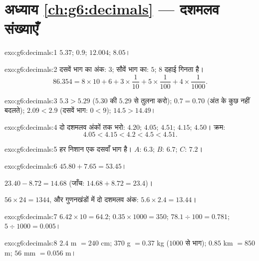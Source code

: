 \section*{अध्याय \ref{ch:g6:decimals} --- दशमलव संख्याएँ}

\begin{solution}{exo:g6:decimals:1}
$5.37$; \quad $0.9$; \quad $12.004$; \quad $8.05$।
\end{solution}

\begin{solution}{exo:g6:decimals:2}
दसवें भाग का अंक: $3$; सौवें भाग का: $5$; $8$ दहाई गिनता है।
\[
86.354 = 8 \times 10 + 6 + 3 \times \frac{1}{10} + 5 \times
\frac{1}{100} + 4 \times \frac{1}{1000}.
\]
\end{solution}

\begin{solution}{exo:g6:decimals:3}
$5.3 > 5.29$ ($5.30$ की $5.29$ से तुलना करो); \quad
$0.7 = 0.70$ (अंत के  कुछ नहीं बदलते); \quad
$2.09 < 2.9$ (दसवें भाग: $0 < 9$); \quad
$14.5 > 14.49$।
\end{solution}

\begin{solution}{exo:g6:decimals:4}
दो दशमलव अंकों तक भरो: $4.20$; $4.05$; $4.51$; $4.15$; $4.50$। क्रम:
\[
4.05 < 4.15 < 4.2 < 4.5 < 4.51 .
\]
\end{solution}

\begin{solution}{exo:g6:decimals:5}
हर निशान एक दसवाँ भाग है। $A$: $6.3$; \quad $B$: $6.7$; \quad
$C$: $7.2$।
\end{solution}

\begin{solution}{exo:g6:decimals:6}
$45.80 + 7.65 = 53.45$।

$23.40 - 8.72 = 14.68$ (जाँच: $14.68 + 8.72 = 23.4$)।

$56 \times 24 = 1344$, और गुणनखंडों में दो दशमलव अंक:
$5.6 \times 2.4 = 13.44$।
\end{solution}

\begin{solution}{exo:g6:decimals:7}
$6.42 \times 10 = 64.2$; \quad
$0.35 \times 1000 = 350$; \quad
$78.1 \div 100 = 0.781$; \quad
$5 \div 1000 = 0.005$।
\end{solution}

\begin{solution}{exo:g6:decimals:8}
$2.4$ m $= 240$ cm; \quad $370$ g $= 0.37$ kg ($1000$ से भाग);
\quad $0.85$ km $= 850$ m; \quad $56$ mm $= 0.056$ m।
\end{solution}

